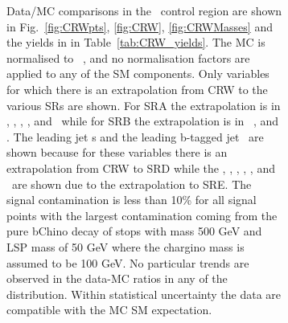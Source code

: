 \begin{figure}[htbp]
\begin{center}
\begin{figure}[htbp]
\begin{center}
{{%
%  
%  
%  
%
%  
%  
%  
%
%
%  
%  
%  









Data/MC comparisons in the \Wjets\ control region are shown in
Fig.~\ref{fig:CRWpts}, \ref{fig:CRW}, \ref{fig:CRWMasses} and the yields in in
Table~\ref{tab:CRW_yields}. The MC is normalised to \intlumi\ \ifb,
and no normalisation factors are applied to any of the SM
components. Only variables for which there is an extrapolation from
CRW to the various SRs are shown. For SRA the extrapolation is in
\met, \drbjetbjet, \mantikttwelvezero,  \mantikttwelveone, and
\mantikteightzero\ while for SRB the extrapolation is in \mtbmin\,
\mtbmax, and \drbjetbjet. The leading jet \pt s and the leading
b-tagged jet \pt\ are shown because for these variables there is an extrapolation from CRW to SRD while the \met, \mtbmin, \HT, \htsig, \mantikteightzero, and \mantikteightone\ are shown due to the extrapolation to SRE. The signal contamination is less than 10\% for all signal points with the largest contamination coming from the pure bChino decay of stops with mass 500 GeV and LSP mass of 50 GeV where the chargino mass is assumed to be 100 GeV. No particular trends are observed in the data-MC ratios in any of the distribution. Within statistical uncertainty the data are compatible with the MC SM expectation. \\

}}
\end{center}
\end{figure}
\end{center}
\end{figure}
